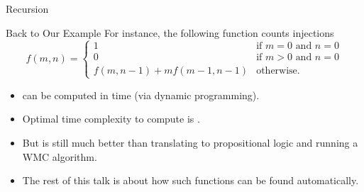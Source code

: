 \documentclass{beamer}
\begin{document}
{
  \begin{frame}{Recursion}
  \end{frame}
}

\begin{frame}{Back to Our Example}
  For instance, the following function counts injections
  \[
  f(m, n) =
  \begin{cases}
    1 & \text{if } m = 0 \text{ and } n = 0 \\
    0 & \text{if } m > 0 \text{ and } n = 0 \\
    f(m, n-1) + mf(m-1, n-1) & \text{otherwise.}
  \end{cases}
  \]
  \pause
  \begin{itemize}
    \item {} can be computed in  time (via
          dynamic programming).
    \item Optimal time complexity to compute  is
          .
    \item But  is still much better than translating to
          propositional logic and running a WMC algorithm.
    \item The rest of this talk is about how such functions can be found
          automatically.
  \end{itemize}
\end{frame}
\end{document}
